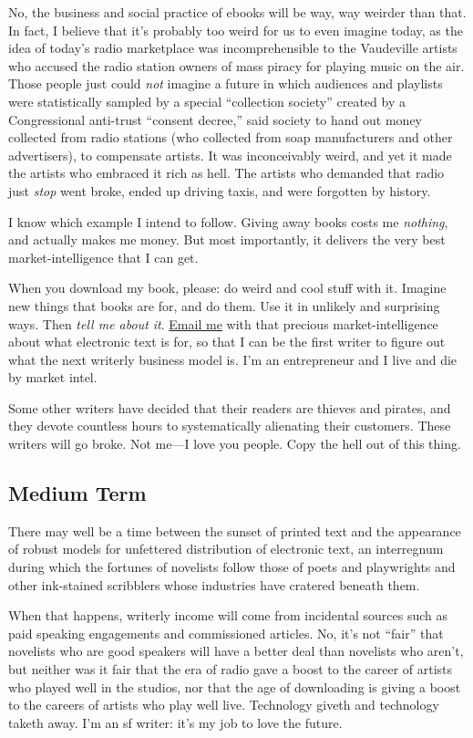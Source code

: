 No, the business and social practice of ebooks will be way, way
weirder than that.  In fact, I believe that it's probably too weird
for us to even imagine today, as the idea of today's radio marketplace
was incomprehensible to the Vaudeville artists who accused the radio
station owners of mass piracy for playing music on the air.  Those
people just could \textit{not} imagine a future in which audiences and
playlists were statistically sampled by a special ``collection
society'' created by a Congressional anti-trust ``consent decree,''
said society to hand out money collected from radio stations (who
collected from soap manufacturers and other advertisers), to
compensate artists.  It was inconceivably weird, and yet it made the
artists who embraced it rich as hell.  The artists who demanded that
radio just \textit{stop} went broke, ended up driving taxis, and were
forgotten by history. 

I know which example I intend to follow.  Giving away books costs me
\textit{nothing}, and actually makes me money.  But most importantly,
it delivers the very best market-intelligence that I can get. 

When you download my book, please:  do weird and cool stuff with it. 
Imagine new things that books are for, and do them.  Use it in
unlikely and surprising ways.  Then \textit{tell me about it}. 
\href{mailto:doctorow@craphound.com}{Email me} with that precious
market-intelligence about what electronic text is for, so that I can
be the first writer to figure out what the next writerly business
model is.  I'm an entrepreneur and I live and die by market intel.

Some other writers have decided that their readers are thieves and
pirates, and they devote countless hours to systematically alienating
their customers.  These writers will go broke.  Not me---I love you
people.  Copy the hell out of this thing.

\subsection{Medium Term}

There may well be a time between the sunset of printed text and the
appearance of robust models for unfettered distribution of electronic
text, an interregnum during which the fortunes of novelists follow
those of poets and playwrights and other ink-stained scribblers whose
industries have cratered beneath them.

When that happens, writerly income will come from incidental sources
such as paid speaking engagements and commissioned articles.  No, it's
not ``fair'' that novelists who are good speakers will have a better
deal than novelists who aren't, but neither was it fair that the era
of radio gave a boost to the career of artists who played well in the
studios, nor that the age of downloading is giving a boost to the
careers of artists who play well live.  Technology giveth and
technology taketh away.  I'm an sf writer:  it's my job to love the
future.

